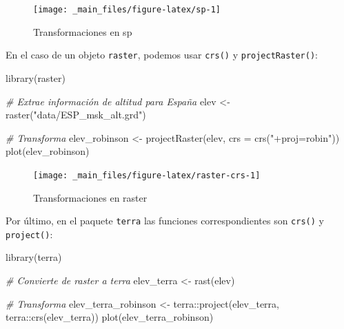 \documentclass[
]{report}
\newenvironment{Shaded}{\begin{snugshade}}{\end{snugshade}}
\newcommand{\AttributeTok}[1]{\textcolor[rgb]{0.77,0.63,0.00}{#1}}
\newcommand{\CommentTok}[1]{\textcolor[rgb]{0.56,0.35,0.01}{\textit{#1}}}
\newcommand{\FunctionTok}[1]{\textcolor[rgb]{0.00,0.00,0.00}{#1}}
\newcommand{\NormalTok}[1]{#1}
\newcommand{\OtherTok}[1]{\textcolor[rgb]{0.56,0.35,0.01}{#1}}
\newcommand{\SpecialCharTok}[1]{\textcolor[rgb]{0.00,0.00,0.00}{#1}}
\newcommand{\StringTok}[1]{\textcolor[rgb]{0.31,0.60,0.02}{#1}}
\begin{document}
\begin{figure}

{\centering \texttt{[image: \_main\_files/figure-latex/sp-1]} 

}

\caption{Transformaciones en sp}\label{fig:sp}
\end{figure}

En el caso de un objeto \texttt{raster}, podemos usar \texttt{crs()} y \texttt{projectRaster()}:

\begin{Shaded}
\begin{Highlighting}[]
\FunctionTok{library}\NormalTok{(raster)}


\CommentTok{\# Extrae información de altitud para España}
\NormalTok{elev }\OtherTok{\textless{}{-}} \FunctionTok{raster}\NormalTok{(}\StringTok{"data/ESP\_msk\_alt.grd"}\NormalTok{)}


\CommentTok{\# Transforma}
\NormalTok{elev\_robinson }\OtherTok{\textless{}{-}} \FunctionTok{projectRaster}\NormalTok{(elev, }\AttributeTok{crs =} \FunctionTok{crs}\NormalTok{(}\StringTok{"+proj=robin"}\NormalTok{))}
\FunctionTok{plot}\NormalTok{(elev\_robinson)}
\end{Highlighting}
\end{Shaded}

\begin{figure}

{\centering \texttt{[image: \_main\_files/figure-latex/raster-crs-1]} 

}

\caption{Transformaciones en raster}\label{fig:raster-crs}
\end{figure}

Por último, en el paquete \texttt{terra} las funciones correspondientes son \texttt{crs()} y
\texttt{project()}:

\begin{Shaded}
\begin{Highlighting}[]
\FunctionTok{library}\NormalTok{(terra)}

\CommentTok{\# Convierte de raster a terra}
\NormalTok{elev\_terra }\OtherTok{\textless{}{-}} \FunctionTok{rast}\NormalTok{(elev)}


\CommentTok{\# Transforma}
\NormalTok{elev\_terra\_robinson }\OtherTok{\textless{}{-}}\NormalTok{ terra}\SpecialCharTok{::}\FunctionTok{project}\NormalTok{(elev\_terra, terra}\SpecialCharTok{::}\FunctionTok{crs}\NormalTok{(elev\_terra))}
\FunctionTok{plot}\NormalTok{(elev\_terra\_robinson)}
\end{Highlighting}
\end{Shaded}
\end{document}

